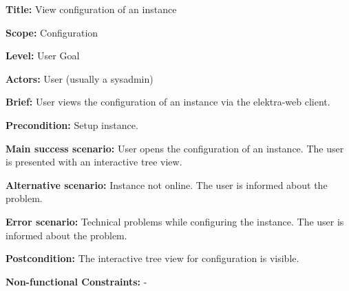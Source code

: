 
\begin{DoxyItemize}
\item {\bfseries Title\+:} View configuration of an instance
\item {\bfseries Scope\+:} Configuration
\item {\bfseries Level\+:} User Goal
\item {\bfseries Actors\+:} User (usually a sysadmin)
\item {\bfseries Brief\+:} User views the configuration of an instance via the elektra-\/web client.
\end{DoxyItemize}


\begin{DoxyItemize}
\item {\bfseries Precondition\+:} Setup instance.
\item {\bfseries Main success scenario\+:} User opens the configuration of an instance. The user is presented with an interactive tree view.
\item {\bfseries Alternative scenario\+:} Instance not online. The user is informed about the problem.
\item {\bfseries Error scenario\+:} Technical problems while configuring the instance. The user is informed about the problem.
\item {\bfseries Postcondition\+:} The interactive tree view for configuration is visible.
\item {\bfseries Non-\/functional Constraints\+:} -\/ 
\end{DoxyItemize}